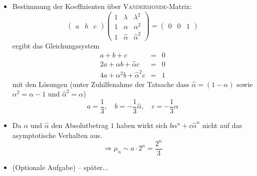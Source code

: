 \begin{itemize}
  \item Bestimmung der Koeffizienten über \textsc{Vandermonde}-Matrix:
    \[ \begin{pmatrix} a&b&c \end{pmatrix} 
       \begin{pmatrix} 1 & \lambda & \lambda^{2} \\ 
                       1 & \alpha  & \alpha^{2} \\
                       1 & \hat \alpha & \hat \alpha^{2} \end{pmatrix} =
       \begin{pmatrix} 0 & 0 & 1 \end{pmatrix} \]
    ergibt das Gleichungssystem
    \begin{eqnarray*}
    a + b + c &=& 0 \\
    2a + \alpha b + \hat \alpha c &=& 0 \\
    4a + \alpha^{2} b + \hat \alpha^{2} c &=& 1
    \end{eqnarray*}
    mit den Lösungen (unter Zuhilfenahme der Tatsache dass $\hat \alpha = (1 -
    \alpha)$ sowie $\alpha^{2} = \alpha - 1$ und $\hat \alpha^{2} = \alpha$)
    \[ a = \frac{1}{3}, \quad
       b = -\frac{1}{3}\hat \alpha, \quad
       c = -\frac{1}{3}\alpha \]

  \item Da $\alpha$ und $\hat \alpha$ den Absolutbetrag $1$ haben wirkt sich
    $b\alpha^{n} + c\hat \alpha^{n}$ nicht auf das asymptotische Verhalten aus.
    \[ \Rightarrow \mu_{n} \sim a\cdot 2^{n} = \frac{2^{n}}{3} \]

  \item (Optionale Aufgabe) -- später...
\end{itemize}
